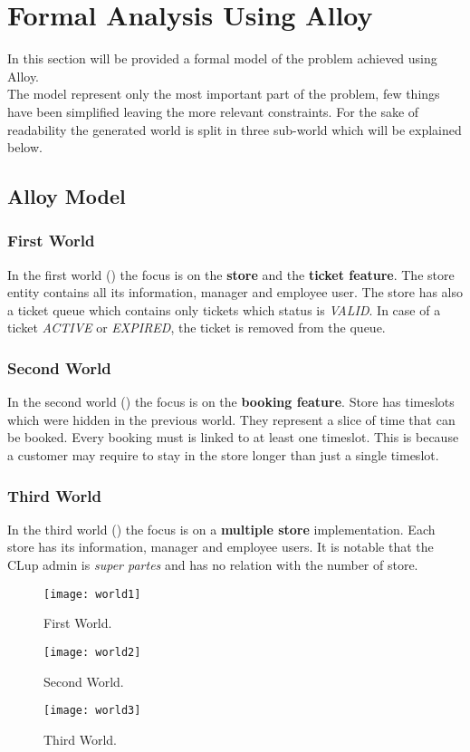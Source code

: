\chapter{Formal Analysis Using Alloy}
In this section will be provided a formal model of the problem achieved using Alloy. \\
The model represent only the most important part of the problem, few things have been simplified leaving the more relevant constraints.\newline
For the sake of readability the generated world is split in three sub-world which will be explained below.

\section{Alloy Model}


\subsection{First World}
In the first world () the focus is on the \textbf{store} and the \textbf{ticket feature}. The store entity contains all its information, manager and employee user. The store has also a ticket queue which contains only tickets which status is \textit{VALID}.
In case of a ticket \textit{ACTIVE} or \textit{EXPIRED}, the ticket is removed from the queue.
\subsection{Second World}
In the second world () the focus is on the \textbf{booking feature}. Store has timeslots which were hidden in the previous world. They represent a slice of time that can be booked.
Every booking must is linked to at least one timeslot. This is because a customer may require to stay in the store longer than just a single timeslot.

\subsection{Third World}
In the third world () the focus is on a \textbf{multiple store} implementation. Each store has its information, manager and employee users. It is notable that the CLup admin is \textit{super partes} and has no relation with the number of store.

\begin{figure}[H]
	\centering
	\texttt{[image: world1]}
	\caption{First World.}
	\label{fig:world1}
\end{figure}
\begin{figure}[H]
	\centering
	\texttt{[image: world2]}
	\caption{Second World.}
	\label{fig:world2}
\end{figure}
\begin{figure}[H]
	\centering
	\texttt{[image: world3]}
	\caption{Third World.}
	\label{fig:world3}
\end{figure}